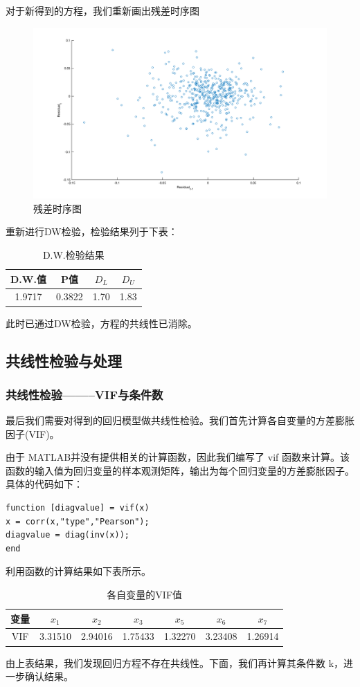 \documentclass[11pt]{article}
\begin{document}
对于新得到的方程，我们重新画出残差时序图
\begin{figure}[H]
	\centering
	\caption{残差时序图}
	\label{gra.15}
	\includegraphics[scale=0.35]{images/residuals_interation.png}
\end{figure}
重新进行DW检验，检验结果列于下表：
\begin{table}[H]
\centering
\caption{D.W.检验结果}
\begin{tabular}{cccc}
		\hline
		D.W.值&P值&$D_L$&$D_U$\\
		\hline
		1.9717&0.3822&1.70&1.83\\
		\hline
	\end{tabular}
\end{table}
此时已通过DW检验，方程的共线性已消除。
\subsection{共线性检验与处理}
\subsubsection*{共线性检验--------VIF与条件数}
最后我们需要对得到的回归模型做共线性检验。我们首先计算各自变量的方差膨胀因子(VIF)。

由于 MATLAB并没有提供相关的计算函数，因此我们编写了 vif 函数来计算。该函数的输入值为回归变量的样本观测矩阵，输出为每个回归变量的方差膨胀因子。具体的代码如下：
\begin{lstlisting}
function [diagvalue] = vif(x)
x = corr(x,"type","Pearson");
diagvalue = diag(inv(x));
end
\end{lstlisting}
利用函数的计算结果如下表所示。
\begin{table}[H]
	\centering
	\caption{各自变量的VIF值}
	\begin{tabular}{ccccccc}
		\hline
		变量& $x_1$    & $x_2$    & $x_3$  &   $x_5$    & $x_6$    & $x_7$  \\
		\hline
		VIF&3.31510& 2.94016&1.75433&1.32270&3.23408&1.26914\\
		\hline
	\end{tabular}
\end{table}
由上表结果，我们发现回归方程不存在共线性。下面，我们再计算其条件数 k，进一步确认结果。
\end{document}
